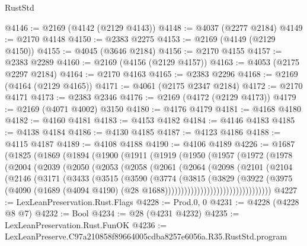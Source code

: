 \begin{lexlean}{RustStd}
\begin{coremodule}
@4146 := @2169 (@4142 (@2129 @4143))
@4148 := @4037 (@2277 @2184)
@4149 := @2170 @4148
@4150 := @2383 @2275
@4153 := @2169 (@4149 (@2129 @4150))
@4155 := @4045 (@3646 @2184)
@4156 := @2170 @4155
@4157 := @2383 @2289
@4160 := @2169 (@4156 (@2129 @4157))
@4163 := @4053 (@2175 @2297 @2184)
@4164 := @2170 @4163
@4165 := @2383 @2296
@4168 := @2169 (@4164 (@2129 @4165))
@4171 := @4061 (@2175 @2347 @2184)
@4172 := @2170 @4171
@4173 := @2383 @2346
@4176 := @2169 (@4172 (@2129 @4173))
@4179 := @2169 (@4071 @4002) @3150
@4180 := @4176 @4179
@4181 := @4168 @4180
@4182 := @4160 @4181
@4183 := @4153 @4182
@4184 := @4146 @4183
@4185 := @4138 @4184
@4186 := @4130 @4185
@4187 := @4123 @4186
@4188 := @4115 @4187
@4189 := @4108 @4188
@4190 := @4106 @4189
@4226 := @1687
    (@1825
      (@1869
        (@1894
          (@1900
            (@1911
              (@1919
                (@1950
                  (@1957
                    (@1972
                      (@1978
                        (@2004
                          (@2039
                            (@2050
                              (@2053
                                (@2058
                                  (@2061
                                    (@2064
                                      (@2098
                                        (@2101
                                          (@2104
                                            (@2146
                                              (@3171
                                                (@3433
                                                  (@3515
                                                    (@3590
                                                      (@3774
                                                        (@3815
                                                          (@3829
                                                            (@3922
                                                              (@3975
                                                                (@4090
                                                                  (@1689
                                                                    (@4094 @4190)
                                                                    (@28
                                                                      @1688)))))))))))))))))))))))))))))))))
@4227 := LexLeanPreservation.Rust.Flags
@4228 := Prod.{0, 0}
@4231 := @4228 (@4228 @8 @7)
@4232 := Bool
@4234 := @28 (@4231 @4232)
@4235 := LexLeanPreservation.Rust.FunOK
@4236 := LexLeanPreserve.C97a210858f89664005cdba8257e6056a.R35.RustStd.program

\end{coremodule}
\end{lexlean}
